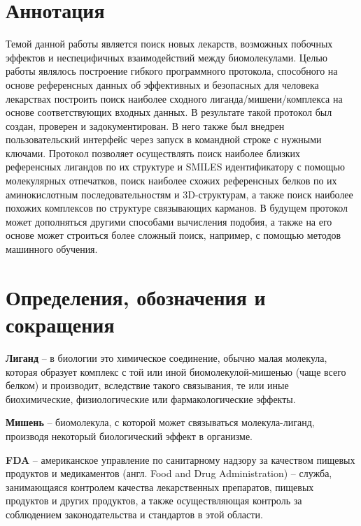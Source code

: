 \documentclass[a4paper,14pt]{article}         %
\begin{document}
\section*{Аннотация}
	\Large
Темой данной работы является поиск новых лекарств, возможных побочных эффектов и неспецифичных взаимодействий между биомолекулами. Целью работы являлось построение гибкого программного протокола, способного на основе референсных данных об эффективных и безопасных для человека лекарствах построить поиск наиболее сходного лиганда/мишени/комплекса на основе соответствующих входных данных. В результате такой протокол был создан, проверен и задокументирован. \color{orange}В него также был внедрен пользовательский интерфейс через запуск в командной строке с нужными ключами\color{black}. Протокол позволяет осуществлять поиск наиболее близких референсных лигандов по их структуре и SMILES идентификатору с помощью молекулярных отпечатков, поиск наиболее схожих референсных белков по их аминокислотным последовательностям и 3D-структурам, а также поиск наиболее похожих комплексов по структуре связывающих карманов. В будущем протокол может дополняться другими способами вычисления подобия, а также на его основе может строиться более сложный поиск, например, с помощью методов машинного обучения.

\setcounter{page}{2}            %

\newpage                        %
\tableofcontents                %

\newpage
\section*{Определения, обозначения и сокращения}

\textbf{Лиганд} -- в биологии это химическое соединение, обычно малая молекула, которая образует комплекс с той или иной биомолекулой-мишенью (чаще всего белком) и производит, вследствие такого связывания, те или иные биохимические, физиологические или фармакологические эффекты.

\textbf{Мишень} -- биомолекула, с которой может связываться молекула-лиганд, производя некоторый биологический эффект в организме.

\textbf{FDA} -- американское управление по санитарному надзору за качеством пищевых продуктов и медикаментов (англ. Food and Drug \linebreak Administration) -- служба, занимающаяся контролем качества лекарственных препаратов, пищевых продуктов и других продуктов, а также осуществляющая контроль за соблюдением законодательства и стандартов в этой области. 
\end{document}
